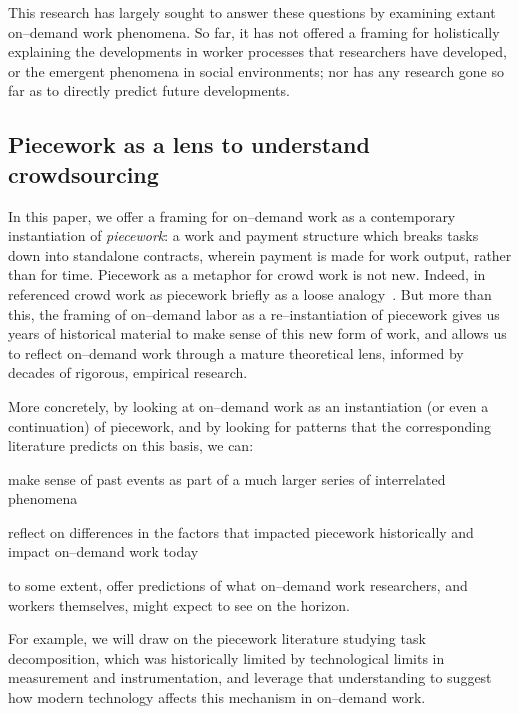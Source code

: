 \documentclass[trackingWork]{subfiles}
\begin{document}
This research has largely sought to answer these questions by examining extant on--demand work phenomena.
So far, it has not offered a framing for holistically explaining
the developments in worker processes that researchers have developed, or
the emergent phenomena in social environments;
nor has any research
gone so far as to directly predict future developments.

\subsection{Piecework as a lens to understand crowdsourcing}
In this paper, we offer a framing for on--demand work as a contemporary instantiation of \textit{piecework}: %
a work and payment structure which breaks tasks down into standalone contracts,
wherein payment is made for work output, rather than for time.
Piecework as a metaphor for crowd work is not new.
Indeed,
\citeauthor{crowdworkFuture} in \citeyear{crowdworkFuture}
referenced crowd work as piecework briefly
as a loose analogy~\cite{crowdworkFuture}.
But more than this,
the framing of on--demand labor as a re--instantiation of piecework
gives us years of historical material to make sense of this new form of work, and allows us to reflect on--demand work through a mature theoretical lens, informed by decades of rigorous, empirical research.

More concretely, by looking at on--demand work as
an instantiation (or even a continuation) of piecework,
and by looking for patterns that the corresponding literature predicts
on this basis, we can:
\begin{numberlist}[itemjoin*={;~and~},itemjoin={;~}]
  \item make sense of past events as part of a much larger series of interrelated phenomena
  \item reflect on differences in the factors that impacted piecework historically and impact on--demand work today
  \item to some extent, offer predictions of what on--demand work researchers,
        and workers themselves,
        might expect to see on the horizon.
\end{numberlist}
For example, we will draw on the piecework literature studying task decomposition,
which was historically limited by technological limits in measurement and instrumentation, and
leverage that understanding to suggest how modern technology affects this mechanism in on--demand work. 
\end{document}
